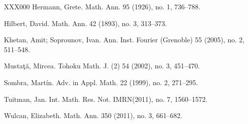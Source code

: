 \documentclass[a4paper,11pt]{amsart}
\numberwithin{thm}{section}
\numberwithin{equation}{section}
\theoremstyle{definition}
\theoremstyle{plain}
\begin{document}
\begin{thebibliography}{XXX000}
Hermann, Grete.
\newblock Math. Ann. 95 (1926), no. 1, 736--788.

Hilbert, David.
\newblock Math. Ann. 42 (1893), no. 3, 313--373.

Khetan, Amit; Soprounov, Ivan.
\newblock Ann. Inst. Fourier (Grenoble) 55 (2005), no. 2, 511--548.

Musta\c{t}\u{a}, Mircea.
Tohoku Math. J. (2) 54 (2002), no. 3, 451--470.

Sombra, Mart\'in.
\newblock Adv. in Appl. Math. 22 (1999), no. 2, 271--295.

Tuitman, Jan.
\newblock  Int. Math. Res. Not. IMRN(2011), no. 7, 1560--1572.

Wulcan, Elizabeth.
\newblock Math. Ann. 350 (2011), no. 3, 661--682.


\end{thebibliography}
\end{document}
